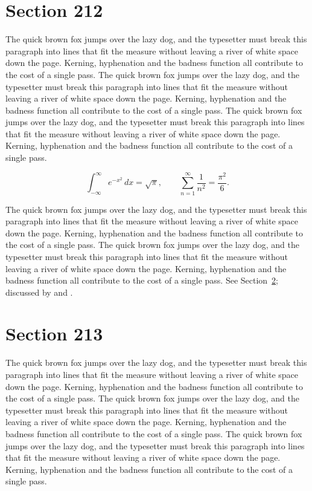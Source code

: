 \documentclass{article}
\begin{document}
\section{Section 212}
\label{sec:212}
The quick brown fox jumps over the lazy dog, and the typesetter must break this paragraph into lines that fit the measure without leaving a river of white space down the page. Kerning, hyphenation and the badness function all contribute to the cost of a single pass. The quick brown fox jumps over the lazy dog, and the typesetter must break this paragraph into lines that fit the measure without leaving a river of white space down the page. Kerning, hyphenation and the badness function all contribute to the cost of a single pass. The quick brown fox jumps over the lazy dog, and the typesetter must break this paragraph into lines that fit the measure without leaving a river of white space down the page. Kerning, hyphenation and the badness function all contribute to the cost of a single pass. 

\begin{equation}\label{eq:212}
\int_{-\infty}^{\infty} e^{-x^{2}}\,dx = \sqrt{\pi}, \qquad
\sum_{n=1}^{\infty} \frac{1}{n^{2}} = \frac{\pi^{2}}{6}.
\end{equation}

The quick brown fox jumps over the lazy dog, and the typesetter must break this paragraph into lines that fit the measure without leaving a river of white space down the page. Kerning, hyphenation and the badness function all contribute to the cost of a single pass. The quick brown fox jumps over the lazy dog, and the typesetter must break this paragraph into lines that fit the measure without leaving a river of white space down the page. Kerning, hyphenation and the badness function all contribute to the cost of a single pass. 
See Section~\ref{sec:213}; discussed by \textcite{k3} and \textcite{l5}.
\section{Section 213}
\label{sec:213}
The quick brown fox jumps over the lazy dog, and the typesetter must break this paragraph into lines that fit the measure without leaving a river of white space down the page. Kerning, hyphenation and the badness function all contribute to the cost of a single pass. The quick brown fox jumps over the lazy dog, and the typesetter must break this paragraph into lines that fit the measure without leaving a river of white space down the page. Kerning, hyphenation and the badness function all contribute to the cost of a single pass. The quick brown fox jumps over the lazy dog, and the typesetter must break this paragraph into lines that fit the measure without leaving a river of white space down the page. Kerning, hyphenation and the badness function all contribute to the cost of a single pass. 
\end{document}
